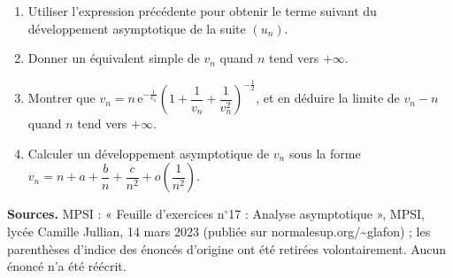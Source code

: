 \documentclass[11pt,a4paper]{article}
\newcommand{\ee}{\mathrm{e}}
\begin{document}
\begin{enumerate}
\begin{enumerate}
 \item Utiliser l'expression précédente pour obtenir le terme suivant du développement asymptotique de la suite $(u_n)$.
 \item Donner un équivalent simple de $v_n$ quand $n$ tend vers $+\infty$.
 \item Montrer que $v_n=n\,\ee^{-\frac{1}{v_n}}\left(1+\dfrac{1}{v_n}+\dfrac{1}{v_n^2}\right)^{-\frac12}$, et en déduire la limite de $v_n-n$ quand $n$ tend vers $+\infty$.
 \item Calculer un développement asymptotique de $v_n$ sous la forme $v_n=n+a+\dfrac bn+\dfrac c{n^2}+o\!\left(\dfrac1{n^2}\right)$.
 \end{enumerate}
\end{enumerate}

\vfill
\begin{small}
\noindent\textbf{Sources.} MPSI : « Feuille d'exercices n$^{\circ}$17 : Analyse asymptotique », MPSI, lycée Camille Jullian, 14 mars 2023 (publiée sur normalesup.org/\textasciitilde glafon) ; les parenthèses d'indice des énoncés d'origine ont été retirées volontairement. Aucun énoncé n'a été réécrit.
\end{small}
\end{document}
